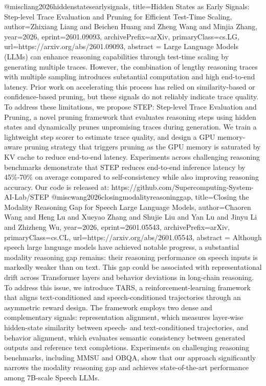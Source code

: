 {}@misc{liang2026hiddenstatesearlysignals,
      title={Hidden States as Early Signals: Step-level Trace Evaluation and Pruning for Efficient Test-Time Scaling}, 
      author={Zhixiang Liang and Beichen Huang and Zheng Wang and Minjia Zhang},
      year={2026},
      eprint={2601.09093},
      archivePrefix={arXiv},
      primaryClass={cs.LG},
      url={https://arxiv.org/abs/2601.09093},
      abstract = {Large Language Models (LLMs) can enhance reasoning capabilities through test-time scaling by generating multiple traces. However, the combination of lengthy reasoning traces with multiple sampling introduces substantial computation and high end-to-end latency. Prior work on accelerating this process has relied on similarity-based or confidence-based pruning, but these signals do not reliably indicate trace quality. To address these limitations, we propose STEP: Step-level Trace Evaluation and Pruning, a novel pruning framework that evaluates reasoning steps using hidden states and dynamically prunes unpromising traces during generation. We train a lightweight step scorer to estimate trace quality, and design a GPU memory-aware pruning strategy that triggers pruning as the GPU memory is saturated by KV cache to reduce end-to-end latency. Experiments across challenging reasoning benchmarks demonstrate that STEP reduces end-to-end inference latency by 45\%-70\% on average compared to self-consistency while also improving reasoning accuracy. Our code is released at: https://github.com/Supercomputing-System-AI-Lab/STEP}
}@misc{wang2026closingmodalityreasoninggap,
      title={Closing the Modality Reasoning Gap for Speech Large Language Models}, 
      author={Chaoren Wang and Heng Lu and Xueyao Zhang and Shujie Liu and Yan Lu and Jinyu Li and Zhizheng Wu},
      year={2026},
      eprint={2601.05543},
      archivePrefix={arXiv},
      primaryClass={cs.CL},
      url={https://arxiv.org/abs/2601.05543},
      abstract = {Although speech large language models have achieved notable progress, a substantial modality reasoning gap remains: their reasoning performance on speech inputs is markedly weaker than on text. This gap could be associated with representational drift across Transformer layers and behavior deviations in long-chain reasoning. To address this issue, we introduce TARS, a reinforcement-learning framework that aligns text-conditioned and speech-conditioned trajectories through an asymmetric reward design. The framework employs two dense and complementary signals: representation alignment, which measures layer-wise hidden-state similarity between speech- and text-conditioned trajectories, and behavior alignment, which evaluates semantic consistency between generated outputs and reference text completions. Experiments on challenging reasoning benchmarks, including MMSU and OBQA, show that our approach significantly narrows the modality reasoning gap and achieves state-of-the-art performance among 7B-scale Speech LLMs.}
}
